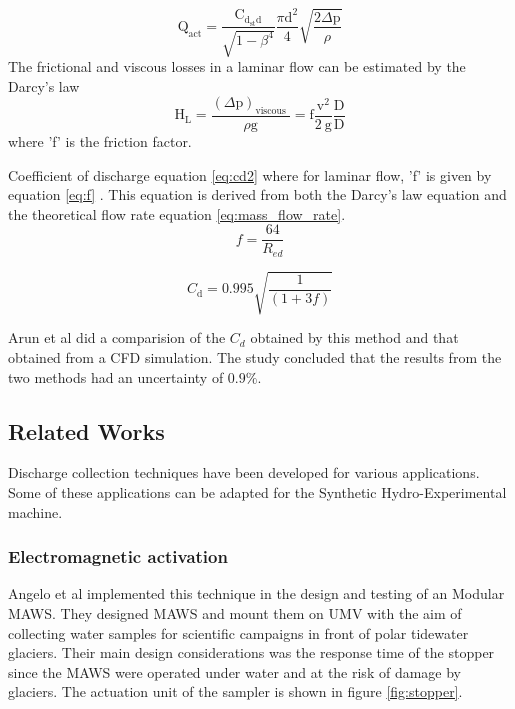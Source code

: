 \begin{equation}
\mathrm{Q}_{\mathrm{act}}=\frac{\mathrm{C}_{\mathrm{d}_{\mathrm{st}} \mathrm{d}}}{\sqrt{1-\beta^{4}}} \frac{\pi \mathrm{d}^{2}}{4} \sqrt{\frac{2 \Delta \mathrm{p}}{\rho}}
\end{equation}
The frictional and viscous losses in a laminar flow can be estimated by the Darcy's law
\begin{equation}
\mathrm{H}_{\mathrm{L}}=\frac{(\Delta \mathrm{p})_{\text {viscous }}}{\rho \mathrm{g}}=\mathrm{f} \frac{\mathrm{v}^{2}}{2 \mathrm{~g}} \frac{\mathrm{D}}{\mathrm{D}}
\end{equation}
where 'f' is the friction factor.
\par
Coefficient of discharge equation \ref{eq:cd2} where for laminar flow, 'f' is given by equation \ref{eq:f} . This equation is derived from both the Darcy's law equation and the theoretical flow rate equation \ref{eq:mass_flow_rate}.
\begin{equation}
f=\frac{64}{R_{e d}}
\label{eq:f}
\end{equation}


\begin{equation}
C_{\mathrm{d}}=0.995 \sqrt{\frac{1}{(1+3 f)}}
\label{eq:cd2}
\end{equation}

\par
Arun et al \cite{arun2015prediction} did  a comparision of the $C_{d}$ obtained by this method and that obtained from a CFD simulation. The study concluded that the results from the two methods had an uncertainty of $0.9\%$.
\subsection{Related Works}
Discharge collection techniques have been developed for various applications. Some of these applications can be adapted for the Synthetic Hydro-Experimental machine.

\subsubsection{Electromagnetic activation}
Angelo et al \cite{odetti2019design} implemented this technique in the design and testing of an Modular \ac{MAWS}. They designed MAWS and mount them on \ac{UMV} with the aim of collecting water samples for scientific campaigns in front of polar tidewater glaciers. Their main design considerations was the response time of the stopper since the MAWS were operated under water and at the risk of damage by glaciers. The actuation unit of the sampler is shown in figure \ref{fig:stopper}. 

